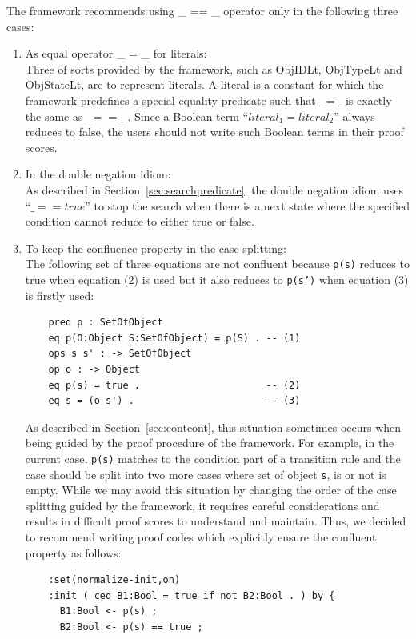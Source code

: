 \documentclass[12pt]{report}
\newcommand{\stt}[1]{{\small{\tt {#1}}}}
\begin{document}
The framework recommends using \_ == \_ operator only in the
following three cases:
\begin{enumerate}
\item As equal operator \_ = \_ for literals: \\
  Three of sorts provided by the framework, such as ObjIDLt, ObjTypeLt
  and ObjStateLt, are to represent literals. A literal is a constant
  for which the framework predefines a special equality predicate such
  that $\_ = \_$ is exactly the same as $\_ == \_ $ . Since a Boolean
  term ``$ literal_1 = literal_2 $'' always reduces to false, the
  users should not write such Boolean terms in their proof scores.
\item In the double negation idiom: \\
  As described in Section~\ref{sec:searchpredicate}, the double
  negation idiom uses ``$\_ == true$'' to stop the search when
  there is a next state where the specified condition cannot
  reduce to either true or false.
\item To keep the confluence property in the case splitting:\\ The
  following set of three equations are not confluent because
  \stt{p(s)} reduces to true when equation (2) is used but it also
  reduces to \stt{p(s')} when equation (3) is firstly used:
  \begin{verbatim}
    pred p : SetOfObject
    eq p(O:Object S:SetOfObject) = p(S) . -- (1)
    ops s s' : -> SetOfObject
    op o : -> Object
    eq p(s) = true .                      -- (2)
    eq s = (o s') .                       -- (3)
  \end{verbatim}\vspace{-0.6cm}
  As described in Section~\ref{sec:contcont}, this situation sometimes
  occurs when being guided by the proof procedure of the
  framework. For example, in the current case, \stt{p(s)} matches to
  the condition part of a transition rule and the case should be split
  into two more cases where set of object \stt{s}, is or not is
  empty. While we may avoid this situation by changing the order of
  the case splitting guided by the framework, it requires careful
  considerations and results in difficult proof scores to understand
  and maintain. Thus, we decided to recommend writing proof codes
  which explicitly ensure the confluent property as follows:
  \begin{verbatim}
    :set(normalize-init,on)
    :init ( ceq B1:Bool = true if not B2:Bool . ) by {
      B1:Bool <- p(s) ;
      B2:Bool <- p(s) == true ;

\end{verbatim}
\end{enumerate}
\end{document}
